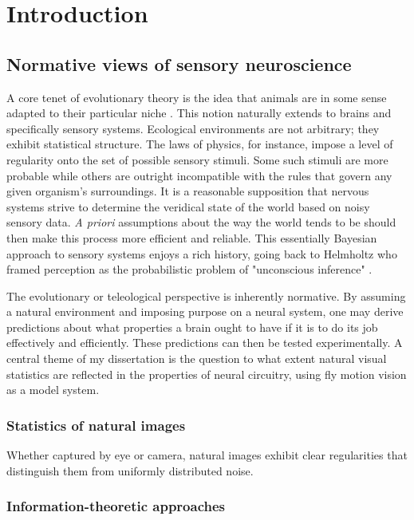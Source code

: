 \chapter{Introduction}
\label{chp:introduction}

\section{Normative views of sensory neuroscience}

A core tenet of evolutionary theory is the idea that animals are in some sense adapted to their particular niche \citep{Darwin:1859aa}. This notion naturally extends to brains and specifically sensory systems. Ecological environments are not arbitrary; they exhibit statistical structure. The laws of physics, for instance, impose a level of regularity onto the set of possible sensory stimuli. Some such stimuli are more probable while others are outright incompatible with the rules that govern any given organism's surroundings. It is a reasonable supposition that nervous systems strive to determine the veridical state of the world based on noisy sensory data. \textit{A priori} assumptions about the way the world tends to be should then make this process more efficient and reliable. This essentially Bayesian approach to sensory systems enjoys a rich history, going back to Helmholtz who framed perception as the probabilistic problem of "unconscious inference" \citep{Helmholtz:1867aa}.

The evolutionary or teleological perspective is inherently normative. By assuming a natural environment and imposing purpose on a neural system, one may derive predictions about what properties a brain ought to have if it is to do its job effectively and efficiently. These predictions can then be tested experimentally. A central theme of my dissertation is the question to what extent natural visual statistics are reflected in the properties of neural circuitry, using fly motion vision as a model system.

\subsection{Statistics of natural images} Whether captured by eye or camera, natural images exhibit clear regularities that distinguish them from uniformly distributed noise.

\subsection{Information-theoretic approaches}

